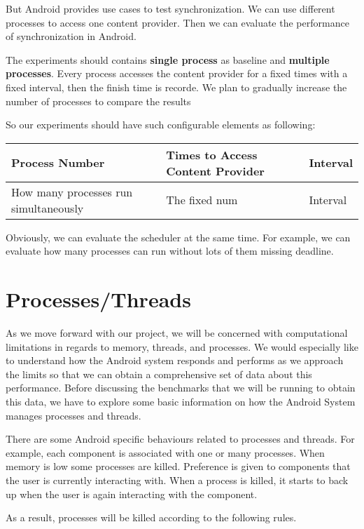 \documentclass[11pt]{article}
\begin{document}
But Android provides use cases to test synchronization. We can use different processes to access one content provider.
Then we can evaluate the performance of synchronization in Android.

The experiments should contains \textbf{single process} as baseline and \textbf{multiple processes}.
Every process accesses the content provider for a fixed times with a fixed interval, then the finish time is recorde.
We plan to gradually increase the number of processes to compare the results

So our experiments should have such configurable elements as following:

\begin{center}
\begin{tabular}{l|l|l}
Process Number & Times to Access Content Provider & Interval\\
\hline
How many processes run simultaneously & The fixed num & Interval\\
\end{tabular}
\end{center}

Obviously, we can evaluate the scheduler  at the same time.
For example, we can evaluate how many processes can run without lots of them missing deadline.

\section{\label{Processes/Threads}Processes/Threads}
\label{sec-5}
As we move forward with our project, we will be concerned with computational limitations in regards to memory, threads, and processes.  We would especially like to understand how the Android system responds and performs as we approach the limits so that we can obtain a comprehensive set of data about this performance.  Before discussing the benchmarks that we will be running to obtain this data, we have to explore some basic information on how the Android System manages processes and threads.

There are some Android specific behaviours related to processes and threads.  For example, each component is associated with one or many processes.  When memory is low some processes are killed.  Preference is given to components that the user is currently interacting with.  When a process is killed, it starts to back up when the user is again interacting with the component.

As a result, processes will be killed according to the following rules.
\end{document}
